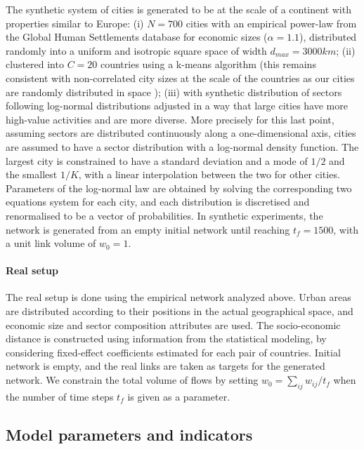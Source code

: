 \documentclass[11pt]{article}
\begin{document}
The synthetic system of cities is generated to be at the scale of a continent with properties similar to Europe: (i) $N=700$ cities with an empirical power-law from the Global Human Settlements database for economic sizes ($\alpha = 1.1$), distributed randomly into a uniform and isotropic square space of width $d_{max}=3000km$; (ii) clustered into $C = 20$ countries using a k-means algorithm (this remains consistent with non-correlated city sizes at the scale of the countries as our cities are randomly distributed in space \citep{simini2019testing}); (iii) with synthetic distribution of sectors following log-normal distributions adjusted in a way that large cities have more high-value activities and are more diverse. More precisely for this last point, assuming sectors are distributed continuously along a one-dimensional axis, cities are assumed to have a sector distribution with a log-normal density function. The largest city is constrained to have a standard deviation and a mode of $1/2$ and the smallest $1/K$, with a linear interpolation between the two for other cities. Parameters of the log-normal law are obtained by solving the corresponding two equations system for each city, and each distribution is discretised and renormalised to be a vector of probabilities. In synthetic experiments, the network is generated from an empty initial network until reaching $t_f=1500$, with a unit link volume of $w_0 = 1$.

     
\paragraph{Real setup}

The real setup is done using the empirical network analyzed above. Urban areas are distributed according to their positions in the actual geographical space, and economic size and sector composition attributes are used. The socio-economic distance is constructed using information from the statistical modeling, by considering fixed-effect coefficients estimated for each pair of countries. Initial network is empty, and the real links are taken as targets for the generated network. We constrain the total volume of flows by setting $w_0 = \sum_{ij} w_{ij} / t_{f}$ when the number of time steps $t_f$ is given as a parameter.


\subsection{Model parameters and indicators}
\end{document}
